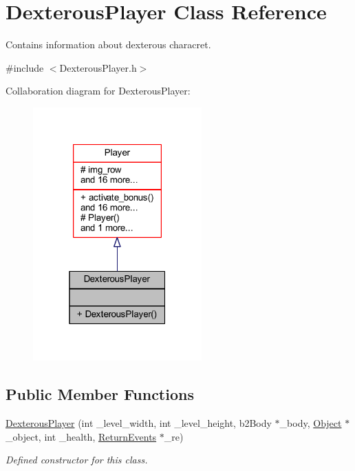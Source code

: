 \hypertarget{class_dexterous_player}{}\section{Dexterous\+Player Class Reference}
\label{class_dexterous_player}


Contains information about dexterous characret.  




{\ttfamily \#include $<$Dexterous\+Player.\+h$>$}



Collaboration diagram for Dexterous\+Player\+:
\nopagebreak
\begin{figure}[H]
\begin{center}
\leavevmode
\includegraphics[width=184pt]{class_dexterous_player__coll__graph}
\end{center}
\end{figure}
\subsection*{Public Member Functions}
\begin{DoxyCompactItemize}
\item 
\hyperlink{class_dexterous_player_a852e50ce93cf01a9b042e58a6bcf2e4e}{Dexterous\+Player} (int \+\_\+level\+\_\+width, int \+\_\+level\+\_\+height, b2\+Body $\ast$\+\_\+body, \hyperlink{class_object}{Object} $\ast$\+\_\+object, int \+\_\+health, \hyperlink{_events_8h_a51620cf702f1b8fdf47cd0a5cfa0ba4f}{Return\+Events} $\ast$\+\_\+re)
\begin{DoxyCompactList}\small\item\em Defined constructor for this class. \end{DoxyCompactList}\end{DoxyCompactItemize}

